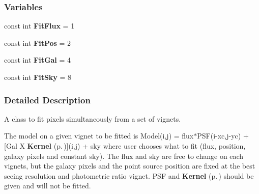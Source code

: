 \subsubsection*{Variables}
\begin{CompactItemize}
\item 
{}
const int {\bf Fit\-Flux} = 1\label{simultaneousfit_h_a0}

\item 
{}
const int {\bf Fit\-Pos} = 2\label{simultaneousfit_h_a1}

\item 
{}
const int {\bf Fit\-Gal} = 4\label{simultaneousfit_h_a2}

\item 
{}
const int {\bf Fit\-Sky} = 8\label{simultaneousfit_h_a3}

\end{CompactItemize}


\subsubsection{Detailed Description}
A class to fit pixels simultaneously from a set of vignets.





 The model on a given vignet to be fitted is  Model(i,j) = flux$\ast$PSF(i-xc,j-yc) + [Gal X {\bf Kernel} {\rm (p.\,\pageref{class_kernel})}](i,j) + sky where user chooses what to fit (flux, position, galaxy pixels and constant sky).  The flux and sky are free to change on each vignets, but the galaxy pixels  and the point source position are fixed at the best seeing resolution and photometric ratio vignet. PSF and {\bf Kernel} {\rm (p.\,\pageref{class_kernel})} should be given and will not be fitted.

